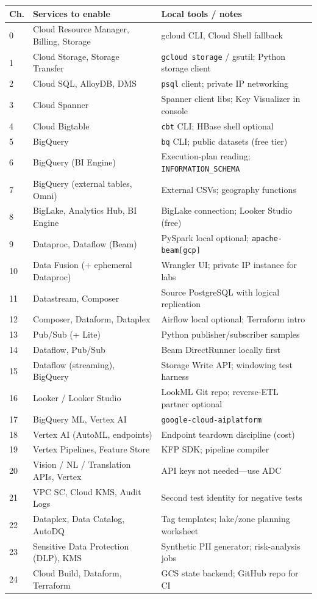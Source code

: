 \begin{center}
\footnotesize
\begin{tabular}{@{}p{1.1cm}p{5.4cm}p{6.3cm}@{}}
\toprule
\textbf{Ch.} & \textbf{Services to enable} & \textbf{Local tools / notes} \\
\midrule
0 & Cloud Resource Manager, Billing, Storage & gcloud CLI, Cloud Shell fallback \\
1 & Cloud Storage, Storage Transfer & \texttt{gcloud storage} / gsutil; Python storage client \\
2 & Cloud SQL, AlloyDB, DMS & \texttt{psql} client; private IP networking \\
3 & Cloud Spanner & Spanner client libs; Key Visualizer in console \\
4 & Cloud Bigtable & \texttt{cbt} CLI; HBase shell optional \\
5 & BigQuery & \texttt{bq} CLI; public datasets (free tier) \\
6 & BigQuery (BI Engine) & Execution-plan reading; \texttt{INFORMATION\_SCHEMA} \\
7 & BigQuery (external tables, Omni) & External CSVs; geography functions \\
8 & BigLake, Analytics Hub, BI Engine & BigLake connection; Looker Studio (free) \\
9 & Dataproc, Dataflow (Beam) & PySpark local optional; \texttt{apache-beam[gcp]} \\
10 & Data Fusion (+ ephemeral Dataproc) & Wrangler UI; private IP instance for labs \\
11 & Datastream, Composer & Source PostgreSQL with logical replication \\
12 & Composer, Dataform, Dataplex & Airflow local optional; Terraform intro \\
13 & Pub/Sub (+ Lite) & Python publisher/subscriber samples \\
14 & Dataflow, Pub/Sub & Beam DirectRunner locally first \\
15 & Dataflow (streaming), BigQuery & Storage Write API; windowing test harness \\
16 & Looker / Looker Studio & LookML Git repo; reverse-ETL partner optional \\
17 & BigQuery ML, Vertex AI & \texttt{google-cloud-aiplatform} \\
18 & Vertex AI (AutoML, endpoints) & Endpoint teardown discipline (cost) \\
19 & Vertex Pipelines, Feature Store & KFP SDK; pipeline compiler \\
20 & Vision / NL / Translation APIs, Vertex & API keys not needed---use ADC \\
21 & VPC SC, Cloud KMS, Audit Logs & Second test identity for negative tests \\
22 & Dataplex, Data Catalog, AutoDQ & Tag templates; lake/zone planning worksheet \\
23 & Sensitive Data Protection (DLP), KMS & Synthetic PII generator; risk-analysis jobs \\
24 & Cloud Build, Dataform, Terraform & GCS state backend; GitHub repo for CI \\
\bottomrule
\end{tabular}
\end{center}

